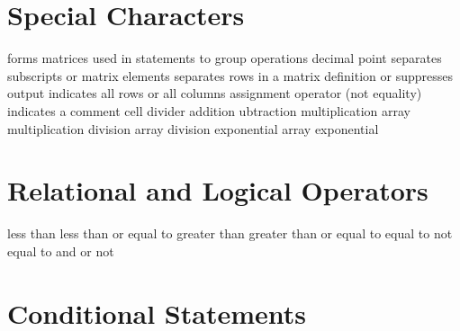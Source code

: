 \section{Special Characters}{}
\cmdOper{[]}	{forms matrices}
\cmdOper{()}	{used in statements to group operations}
	{decimal point}
\cmdOper{,! }	{separates subscripts or matrix elements}
\cmdOper{;}	{separates rows in a matrix definition or suppresses output}
\cmdOper{:}	{indicates all rows or all columns}
\cmdOper{=}	{assignment operator (not equality)}
\cmdOper{\%}	{indicates a comment}
\cmdOper{\%\%}	{cell divider}
\cmdOper{+}	{addition}
\cmdOper{-}	{ubtraction}
\cmdOper{*}	{multiplication}
	{array multiplication}
\cmdOper{/}	{division}
	{array division}
\cmdOper{\expon}	{exponential}
	{array exponential}

\section{Relational and Logical Operators}{}
\cmdOper{<}	{less than}
\cmdOper{<==}	{less than or equal to}
\cmdOper{>}	{greater than}
\cmdOper{>==}	{greater than or equal to}
\cmdOper{==}	{equal to}
\cmdOper{~=}	{not equal to}
\cmdOper{\&}	{and}
\cmdOper{!}	{or}
\cmdOper{\tild}	{not}

\section{Conditional Statements}{}



